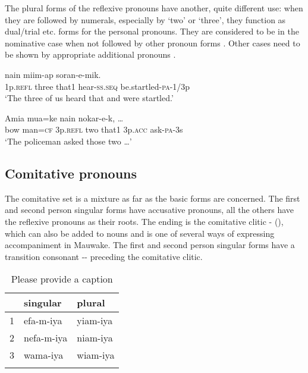 The plural forms of the reflexive pronouns have another, quite different use: when they are followed by numerals, especially by `two' or `three', they function as dual/trial etc. forms for the personal pronouns. They are considered to be in the nominative case when not followed by other pronoun forms . Other cases need to be shown by appropriate additional pronouns .

\ea%
\label{ex:3:x615}
\gll {}  nain miim-ap soran-e-mik. \\
1p.\textsc{refl} three that1 hear-\textsc{ss}.\textsc{seq} be.startled-\textsc{pa}-1/3p\\
\glt`The three of us heard that and were startled.'
\z

\ea%
\label{ex:3:x616}
\gll Amia mua=ke   nain  nokar-e-k, {\dots} \\
bow man=\textsc{cf} 3p.\textsc{refl} two that1 3p.\textsc{acc} ask-\textsc{pa}-3s\\
\glt`The policeman asked those two {\dots}'
\z

\subsection{Comitative pronouns}\label{sec:3:y:x}
{}
The comitative set is a mixture as far as the basic forms are concerned. The first and second person singular forms have accusative pronouns, all the others have the reflexive pronouns as their roots. The ending is the comitative clitic - (), which can also be added to nouns and is one of several ways of expressing accompaniment in Mauwake. The first and second person singular forms have a transition consonant -- preceding the comitative clitic.

\begin{table}
\caption{Please provide a caption}
\label{} 
\begin{tabular}{lll}
\mytoprule
 &singular &plural\\
\midrule
1 &efa-m-iya &yiam-iya\\
2 &nefa-m-iya &niam-iya\\
3 &wama-iya &wiam-iya\\
\mybottomrule
\end{tabular}
\end{table}


